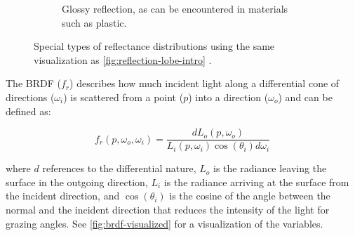 \begin{figure}[H]
\begin{subfigure}[t]{0.45\textwidth}
    \caption{Glossy reflection, as can be encountered in materials such as plastic.}
    \label{fig:reflectionGlossy}
  \end{subfigure}
  \caption{Special types of reflectance distributions using the same visualization as \autoref{fig:reflection-lobe-intro} \cite{Pharr_Physically_Based_Rendering_2023}.}
  \label{fig:brdf-special}
\end{figure}

The \gls{BRDF} ($f_r$) describes how much incident light along a differential cone of directions ($\omega_i$) is scattered from a point ($p$) into a direction ($\omega_o$) and can be defined as:

\begin{equation}
  f_r(p, \omega_o, \omega_i) = \frac{dL_o(p, \omega_o)}{L_i(p, \omega_i) \cos(\theta_i) d\omega_i}
\end{equation}

where $d$ references to the differential nature, $L_o$ is the radiance leaving the surface in the outgoing direction, $L_i$ is the radiance arriving at the surface from the incident direction, and $\cos(\theta_i)$ is the cosine of the angle between the normal and the incident direction that reduces the intensity of the light for grazing angles. See \autoref{fig:brdf-visualized} for a visualization of the variables.

